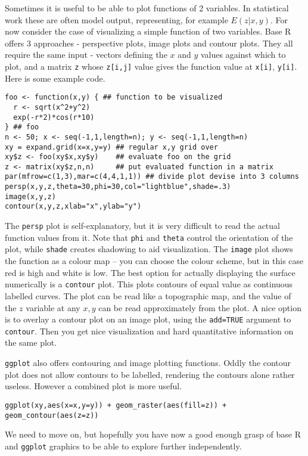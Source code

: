 \documentclass[10pt] {article}
\newcommand{\eps}[3]
{{\begin{center}
 \rotatebox{#1}{\scalebox{#2}{\texttt{[image: \#3]}}}
 \end{center}}
}
\theoremstyle{definition}
\begin{document}
Sometimes it is useful to be able to plot functions of 2 variables. In statistical work these are often model output, representing, for example $E(z|x,y)$. For now consider the case of visualizing a simple function of two variables. Base R offers 3 approaches - perspective plots, image plots and contour plots. They all require the same input - vectors defining the $x$ and $y$ values against which to plot, and a matrix {\tt z} whose \lstinline+z[i,j]+ value gives the function value at \lstinline+x[i]+, \lstinline+y[i]+. Here is some example code.
\begin{lstlisting}
foo <- function(x,y) { ## function to be visualized
  r <- sqrt(x^2+y^2)
  exp(-r*2)*cos(r*10)
} ## foo
n <- 50; x <- seq(-1,1,length=n); y <- seq(-1,1,length=n)
xy = expand.grid(x=x,y=y) ## regular x,y grid over 
xy$z <- foo(xy$x,xy$y)    ## evaluate foo on the grid
z <- matrix(xy$z,n,n)     ## put evaluated function in a matrix
par(mfrow=c(1,3),mar=c(4,4,1,1)) ## divide plot devise into 3 columns
persp(x,y,z,theta=30,phi=30,col="lightblue",shade=.3) 
image(x,y,z)
contour(x,y,z,xlab="x",ylab="y")
\end{lstlisting}
\eps{-90}{.5}{3d.eps} 
The \lstinline+persp+ plot is self-explanatory, but it is very difficult to read the actual function values from it. Note that \lstinline+phi+ and \lstinline+theta+ control the orientation of the plot, while \lstinline+shade+ creates shadowing to aid visualization. The \lstinline+image+ plot shows the function as a colour map -- you can choose the colour scheme, but in this case red is high and white is low. The best option for actually displaying the surface numerically is a \lstinline+contour+ plot. This plots contours of equal value as continuous labelled curves. The plot can be read like a topographic map, and the value of the $z$ variable at any $x,y$ can be read approximately from the plot. A nice option is to overlay a contour plot on an image plot, using the \lstinline+add=TRUE+ argument to \lstinline+contour+. Then you get nice visualization and hard quantitative information on the same plot.


{\tt ggplot} also offers contouring and image plotting functions. Oddly the contour plot does not allow contours to be labelled, rendering the contours alone rather useless. However a combined plot is more useful.
\begin{lstlisting}
ggplot(xy,aes(x=x,y=y)) + geom_raster(aes(fill=z)) + geom_contour(aes(z=z))
\end{lstlisting}
\eps{0}{.5}{gg-contour.eps} 
We need to move on, but hopefully you have now a good enough grasp of base R and {\tt ggplot} graphics to be able to explore further independently.
\end{document}
